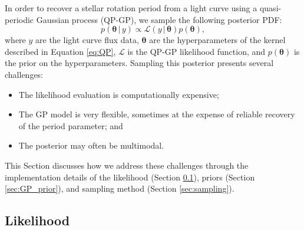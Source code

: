 \documentclass[useAMS, usenatbib, preprint, 12pt]{aastex}
\begin{document}
In order to recover a stellar rotation period from a light curve using a
quasi-periodic Gaussian process (QP-GP), we sample the following posterior
PDF:
\begin{equation}
\label{eq:posterior}
p({\bm \theta}\,|\,y) \propto \mathcal L(y\,|\,{\bm \theta}) p({\bm \theta}),
\end{equation}
where $y$ are the light curve flux data, $\bm \theta$ are the hyperparameters
of the kernel described in Equation \ref{eq:QP}, $\mathcal L$ is the
QP-GP likelihood function, and $p({\bm \theta})$ is the prior on the
hyperparameters.  Sampling this posterior presents several challenges:
\begin{itemize}
    \item The likelihood evaluation is computationally expensive;
    \item The GP model is very flexible, sometimes at the expense of
    reliable recovery of the period parameter; and
    \item The posterior may often be multimodal.
\end{itemize}
This Section discusses how we address these challenges through
the implementation details of the likelihood (Section \ref{sec:GP_lhood}), priors
(Section \ref{sec:GP_prior}), and sampling method (Section \ref{sec:sampling}).

\subsection{Likelihood}
\label{sec:GP_lhood}
\end{document}
